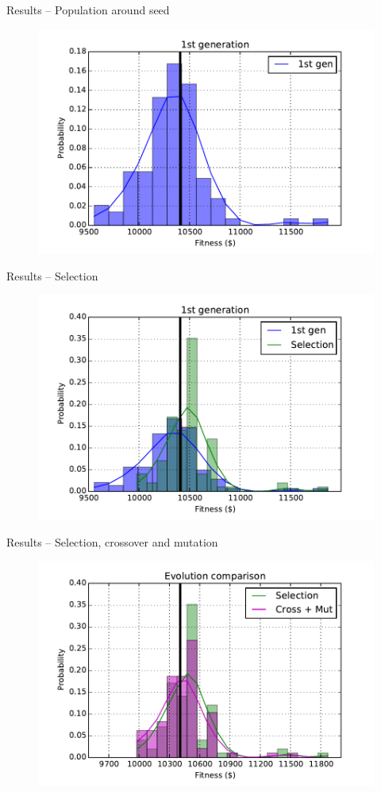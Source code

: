 \documentclass[12pt,portuguese]{beamer}
\begin{document}
\begin{frame}{Results -- Population around seed}
	\begin{figure}[h]
	\centering
	\includegraphics[width=0.9\columnwidth]{images/01l_100.pdf}
	\end{figure}
\end{frame}

\begin{frame}{Results -- Selection}
	\begin{figure}[h]
	\centering
	\includegraphics[width=0.9\columnwidth]{images/01l_100_sel1.pdf}
	\end{figure}
\end{frame}

\begin{frame}{Results -- Selection, crossover and mutation}
	\begin{figure}[h]
	\centering
	\includegraphics[width=0.9\columnwidth]{images/01l_100_cr_mut.pdf}
	\end{figure}
\end{frame}
\end{document}
